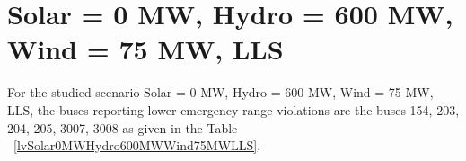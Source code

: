 \documentclass[10pt]{report}
\begin{document}
\section{Solar = 0 MW, Hydro = 600 MW, Wind = 75 MW, LLS}
For the studied scenario Solar = 0 MW, Hydro = 600 MW, Wind = 75 MW, LLS, the buses reporting lower emergency range violations are the buses 154, 203, 204, 205, 3007, 3008 as given in the Table ~\ref{lvSolar0MWHydro600MWWind75MWLLS}.
\begin{table}[H]
\caption{Contingencies reporting bus voltages lower than emergency voltage of 1.1 PU for scenario Solar = 0 MW, Hydro = 600 MW, Wind = 75 MW, LLS}
\label{lvSolar0MWHydro600MWWind75MWLLS}
\centering
{}
\end{table}
\end{document}
